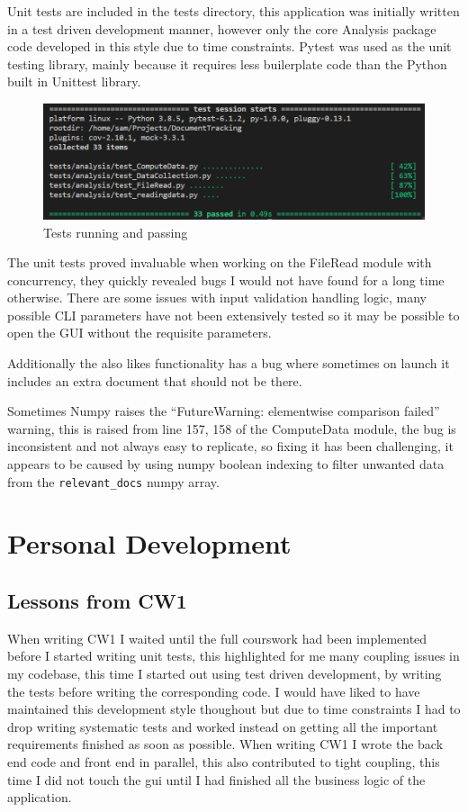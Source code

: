 \documentclass[11pt]{article}
\newcommand{\code}[1]{\colorbox{light-gray}{\texttt{#1}}}
\begin{document}
Unit tests are included in the tests directory, this application was initially written in a test driven development manner, however only the core Analysis package code developed in this style due to time constraints. Pytest was used as the unit testing library, mainly because it requires less builerplate code than the Python built in Unittest library.

\begin{figure}[h]
    \includegraphics{pytest.png}
    \caption{Tests running and passing}
    \label{fig:pytest}
\end{figure}

The unit tests proved invaluable when working on the FileRead module with concurrency, they quickly revealed bugs I would not have found for a long time otherwise.
There are some issues with input validation handling logic, many possible CLI parameters have not been extensively tested so it may be possible to open the GUI without the requisite parameters. 

Additionally the also likes functionality has a bug where sometimes on launch it includes an extra document that should not be there. 

Sometimes Numpy raises the ``FutureWarning: elementwise comparison failed'' warning, this is raised from line 157, 158 of the ComputeData module, the bug is inconsistent and not always easy to replicate, so fixing it has been challenging, it appears to be caused by using numpy boolean indexing to filter unwanted data from the \code{relevant\_docs} numpy array.

\newpage
\section{Personal Development}
\subsection{Lessons from CW1}
When writing CW1 I waited until the full courswork had been implemented before I started writing unit tests, this highlighted for me many coupling issues in my codebase, this time I started out using test driven development, by writing the tests before writing the corresponding code.
I would have liked to have maintained this development style thoughout but due to time constraints I had to drop writing systematic tests and worked instead on getting all the important requirements finished as soon as possible.
When writing CW1 I wrote the back end code and front end in parallel, this also contributed to tight coupling, this time I did not touch the gui until I had finished all the business logic of the application.
\end{document}
